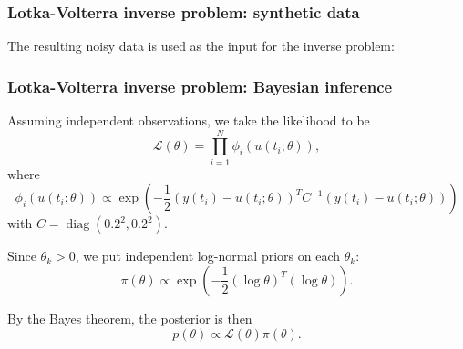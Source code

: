 \documentclass{beamer}
\DeclareMathOperator{\diag}{diag}
\begin{document}
\begin{frame}
\frametitle{Lotka-Volterra inverse problem: synthetic data}

The resulting noisy data is used as the input for the inverse problem:

\begin{figure}[h]
\centering
{}
\end{figure}

\end{frame}

\begin{frame}
\frametitle{Lotka-Volterra inverse problem: Bayesian inference}

Assuming independent observations, we take the likelihood to be
\begin{equation*}
\mathcal{L}(\theta) = \prod_{i=1}^N \phi_i(u(t_i; \theta)),
\end{equation*}
where 
\begin{equation*}
\phi_i(u(t_i;\theta)) \propto \exp\left( -\frac{1}{2} (y(t_i) - u(t_i; \theta))^T C^{-1} (y(t_i) - u(t_i; \theta)) \right)
\end{equation*}
with $C = \diag(0.2^2, 0.2^2)$.

Since $\theta_k > 0$, we put independent log-normal priors on each $\theta_k$:
\begin{equation*}
\pi(\theta) \propto \exp \left(-\frac{1}{2} (\log \theta)^T (\log \theta) \right).
\end{equation*}

By the Bayes theorem, the posterior is then
\begin{equation*}
p(\theta) \propto \mathcal{L}(\theta) \pi(\theta).
\end{equation*}

\end{frame}
\end{document}
